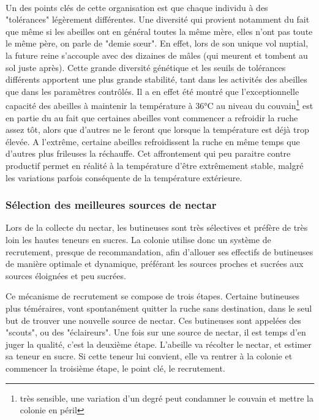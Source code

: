 			\paragraph{}			
			Un des points clés de cette organisation est que chaque individu à des "tolérances" légèrement différentes. Une diversité qui provient notamment du fait que même si les abeilles ont en général toutes la même mère, elles n'ont pas toute le même père, on parle de "demie sœur". En effet, lors de son unique vol nuptial, la future reine s'accouple avec des dizaines de mâles (qui meurent et tombent au sol juste après). Cette grande diversité génétique et les seuils de tolérances différents apportent une plus grande stabilité, tant dans les activités des abeilles que dans les paramètres contrôlés. Il a en effet été montré que l'exceptionnelle capacité des abeilles à maintenir la température à 36°C au niveau du couvain\footnote{très sensible, une variation d'un degré peut condamner le couvain et mettre la colonie en péril} est en partie du au fait que certaines abeilles vont commencer a refroidir la ruche assez tôt, alors que d'autres ne le feront que lorsque la température est déjà trop élevée. A l'extrême, certaine abeilles refroidissent la ruche en même temps que d'autres plus frileuses la réchauffe. Cet affrontement qui peu paraitre contre productif permet en réalité à la température d'être extrêmement stable, malgré les variations parfois conséquente de la température extérieure.
			
			\subsubsection{Sélection des meilleures sources de nectar}
			Lors de la collecte du nectar, les butineuses sont très sélectives et préfère de très loin les hautes teneurs en sucres. La colonie utilise donc un système de recrutement, presque de recommandation, afin d'allouer ses effectifs de butineuses de manière optimale et dynamique, préférant les sources proches et sucrées aux sources éloignées et peu sucrées.
			
			Ce mécanisme de recrutement se compose de trois étapes. Certaine butineuses plus téméraires, vont spontanément quitter la ruche sans destination, dans le seul but de trouver une nouvelle source de nectar. Ces butineuses sont appelées des "scouts", ou des "éclaireurs". Une fois sur une source de nectar, il est temps d'en juger la qualité, c'est la deuxième étape. L'abeille va récolter le nectar, et estimer sa teneur en sucre. Si cette teneur lui convient, elle va rentrer à la colonie et commencer la troisième étape, le point clé, le recrutement.
			
